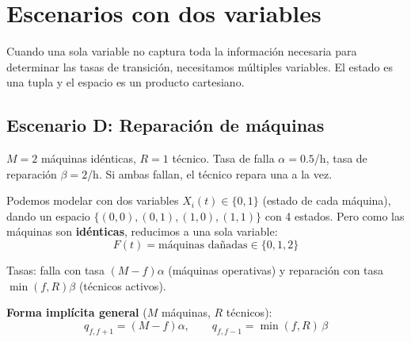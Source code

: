\documentclass[11pt, letterpaper]{article}
\begin{document}
\section{Escenarios con dos variables}

Cuando una sola variable no captura toda la informaci\'on necesaria para determinar las tasas de transici\'on, necesitamos m\'ultiples variables. El estado es una tupla y el espacio es un producto cartesiano.

\subsection{Escenario D: Reparaci\'on de m\'aquinas}

\begin{ejemplobox}[Enunciado]
$M=2$ m\'aquinas id\'enticas, $R=1$ t\'ecnico. Tasa de falla $\alpha=0.5$/h, tasa de reparaci\'on $\beta=2$/h. Si ambas fallan, el t\'ecnico repara una a la vez.
\end{ejemplobox}

Podemos modelar con dos variables $X_i(t)\in\{0,1\}$ (estado de cada m\'aquina), dando un espacio $\{(0,0),(0,1),(1,0),(1,1)\}$ con 4 estados. Pero como las m\'aquinas son \textbf{id\'enticas}, reducimos a una sola variable:
\[
F(t) = \text{m\'aquinas da\~nadas} \in \{0, 1, 2\}
\]

Tasas: falla con tasa $(M-f)\alpha$ (m\'aquinas operativas) y reparaci\'on con tasa $\min(f,R)\beta$ (t\'ecnicos activos).

\begin{center}
\end{center}

\textbf{Forma impl\'icita general} ($M$ m\'aquinas, $R$ t\'ecnicos):
\[
\boxed{q_{f,f+1}=(M-f)\alpha, \qquad q_{f,f-1}=\min(f,R)\,\beta}
\]
\end{document}
